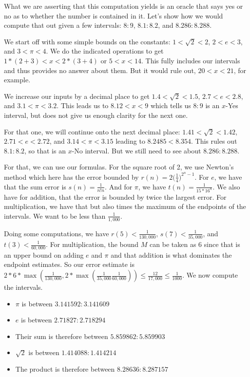 \documentclass[12pt]{article}
\begin{document}
What we are asserting that this computation yields is an oracle that says yes or no as to whether the number is contained in it. Let's show how we would compute that out given a few intervals:  $8:9$, $8.1:8.2$, and $8.286:8.288$.

We start off with some simple bounds on the constants: $1 < \sqrt{2} < 2$, $2<e<3$, and $3 < \pi<4$. We do the indicated operations to get $1*(2+3) < x < 2*(3+4)$ or $5 < x< 14$. This fully includes our intervals and thus provides no answer about them. But it would rule out, $20 < x< 21$, for example. 

We increase our inputs by a decimal place to get $1.4 < \sqrt{2} < 1.5$, $2.7<e<2.8$, and $3.1 < \pi<3.2$. This leads us to $8.12 < x < 9$ which tells us $8:9$ is an $x$-Yes interval, but does not give us enough clarity for the next one. 

For that one, we will continue onto the next decimal place: $1.41 < \sqrt{2} < 1.42$, $2.71<e<2.72$, and $3.14 < \pi<3.15$ leading to $8.2485 < 8.354$. This rules out $8.1:8.2$, so that is an $x$-No interval. But we still need to see about $8.286:8.288$.

For that, we can use our formulas. For the square root of 2, we use Newton's method which here has the error bounded by $r(n) = 2\big(\frac{1}{4}\big)^{2^n-1}$. For $e$, we have that the sum error is $s(n) = \frac{1}{n!n}$. And for $\pi$, we have $t(n) = \frac{1}{15 * 16^n}$. We also have for addition, that the error is bounded by twice the largest error. For multiplication, we have that but also times the maximum of the endpoints of the intervals. We want to be less than $\frac{1}{1,000}$. 

Doing some computations, we have $r(5) < \frac{1}{130,000}$, $s(7) < \frac{1}{35,000}$, and $t(3) < \frac{1}{60,000}$. For multiplication, the bound $M$ can be taken as 6 since that is an upper bound on adding $e$ and $\pi$ and that addition is what dominates the endpoint estimates. So our error estimate is $2*6*\max(\frac{1}{130,000}, 2*\max(\frac{1}{35,000}\frac{1}{60,000})) \leq \frac{12}{17,000} \leq \frac{1}{1000}$. We now compute the intervals.  

\begin{itemize}
    \item $\pi$ is between $3.141592:3.141609$
    \item $e$ is between $2.71827:2.718294$
    \item Their sum is therefore between $5.859862:5.859903$
    \item $\sqrt{2}$ is between $1.414088:1.414214$
    \item The product is therefore between $8.28636:8.287157$
\end{itemize}
\end{document}
